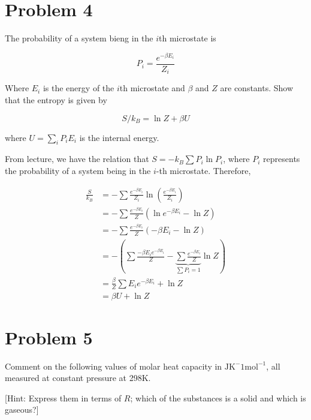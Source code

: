 \documentclass[10pt]{article}
\begin{document}
\section*{Problem 4}

The probability of a system bieng in the $i$th microstate is 

\[ P_i = \frac{e^{-\beta E_i}}{Z_i}\]

Where $E_i$ is the energy of the $i$th microstate and $\beta$ and $Z$ are constants. Show that the entropy is given by 

\[ S/k_B = \ln Z + \beta U\] 

where $U = \sum_i P_iE_i$ is the internal energy. 


\begin{solution}
    From lecture, we have the relation that $S = - k_B \sum P_i \ln P_i$, where $P_i$ represents the probability of a system being in the $i$-th microstate. Therefore, 

    \begin{align*}
        \frac{S}{k_B} &= - \sum \frac{e^{-\beta E_i}}{Z_i}\ln \left(\frac{e^{-\beta E_i}}{Z_i}\right)\\
        &= -\sum \frac{e^{-\beta E_i}}{Z} \left( \ln e^{-\beta E_i} - \ln Z\right)\\
        &= -\sum \frac{e^{-\beta E_i}}{Z}( -\beta E_i - \ln Z)\\
        &= - \left(\sum \frac{-\beta E_i e^{-\beta E_i}}{Z} - \underbrace{\sum \frac{e^{-\beta E_i}}{Z}}_{ \sum P_i = 1} \ln Z\right)\\
        &= \frac{\beta}{Z} \sum E_i e^{-\beta E_i} + \ln Z\\
        &= \beta U + \ln Z
    \end{align*}
\end{solution}

\pagebreak

\section*{Problem 5}

Comment on the following values of molar heat capacity in $\mathrm{JK}^-1 \mathrm{mol}^{-1}$, all measured at constant pressure at 298K. 


[Hint: Express them in terms of $R$; which of the substances is a solid and which is gaseous?]
\end{document}
